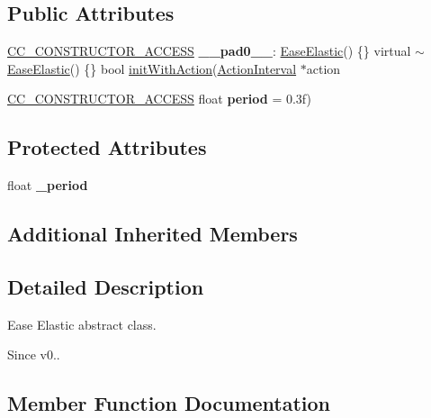 \subsection*{Public Attributes}
\begin{DoxyCompactItemize}
\item 
\mbox{\label{classEaseElastic_a9c681c2d132633b08d9571fe0e5ba31c}} 
\hyperlink{_2cocos2d_2cocos_2base_2ccConfig_8h_a25ef1314f97c35a2ed3d029b0ead6da0}{C\+C\+\_\+\+C\+O\+N\+S\+T\+R\+U\+C\+T\+O\+R\+\_\+\+A\+C\+C\+E\+SS} {\bfseries \+\_\+\+\_\+pad0\+\_\+\+\_\+}\+: \hyperlink{classEaseElastic}{Ease\+Elastic}() \{\} virtual $\sim$\hyperlink{classEaseElastic}{Ease\+Elastic}() \{\} bool \hyperlink{classActionEase_a57660327c119242bbb1fe682fc723b5a}{init\+With\+Action}(\hyperlink{classActionInterval}{Action\+Interval} $\ast$action
\item 
\mbox{\label{classEaseElastic_a3e6ab9549aabe92fe245a6b9bcb891b9}} 
\hyperlink{_2cocos2d_2cocos_2base_2ccConfig_8h_a25ef1314f97c35a2ed3d029b0ead6da0}{C\+C\+\_\+\+C\+O\+N\+S\+T\+R\+U\+C\+T\+O\+R\+\_\+\+A\+C\+C\+E\+SS} float {\bfseries period} = 0.\+3f)
\end{DoxyCompactItemize}
\subsection*{Protected Attributes}
\begin{DoxyCompactItemize}
\item 
\mbox{\label{classEaseElastic_aee0b49109986012571b2cdadf6422117}} 
float {\bfseries \+\_\+period}
\end{DoxyCompactItemize}
\subsection*{Additional Inherited Members}


\subsection{Detailed Description}
Ease Elastic abstract class. 

\begin{DoxySince}{Since}
v0.. 
\end{DoxySince}


\subsection{Member Function Documentation}
\mbox{\label{classEaseElastic_a72d5dc8a380dbb00e68c1d7c80258d28}} 
